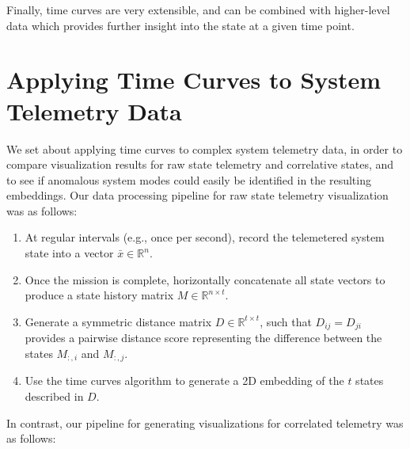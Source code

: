 Finally, time curves are very extensible, and can be combined with higher-level data which provides further insight into the state at a given time point.

\section{Applying Time Curves to System Telemetry Data}

We set about applying time curves to complex system telemetry data, in order to compare visualization results for raw state telemetry and correlative states, and to see if anomalous system modes could easily be identified in the resulting embeddings. Our data processing pipeline for raw state telemetry visualization was as follows:

\begin{enumerate}
    \item At regular intervals (e.g., once per second), record the telemetered system state into a vector $\bar{x} \in \mathbb{R}^{n}$.
    \item Once the mission is complete, horizontally concatenate all state vectors to produce a state history matrix $M \in \mathbb{R}^{n \times t}$.
    \item Generate a symmetric distance matrix $D \in \mathbb{R}^{t \times t}$, such that $D_{ij} = D_{ji}$ provides a pairwise distance score representing the difference between the states $M_{:,i}$ and $M_{:,j}$.
    \item Use the time curves algorithm to generate a 2D embedding of the $t$ states described in $D$.
\end{enumerate}

In contrast, our pipeline for generating visualizations for correlated telemetry was as follows:

